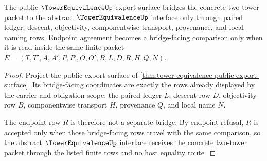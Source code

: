 \begin{theorem}
\label{thm:tower-equivalence-bridge-boundary}
The public $\TowerEquivalenceUp$ export surface bridges the concrete two-tower packet to the abstract $\TowerEquivalenceUp$ interface only through paired ledger, descent, objectivity, componentwise transport, provenance, and local naming rows. Endpoint agreement becomes a bridge-facing comparison only when it is read inside the same finite packet $E=(T,T',A,A',P,P',O,O',B,L,D,R,H,Q,N)$.
\end{theorem}
\begin{proof}
Project the public export surface of \autoref{thm:tower-equivalence-public-export-surface}. Its bridge-facing coordinates are exactly the rows already displayed by the carrier and obligation scope: the paired ledger $L$, descent row $D$, objectivity row $B$, componentwise transport $H$, provenance $Q$, and local name $N$.

The endpoint row $R$ is therefore not a separate bridge. By endpoint refusal, $R$ is accepted only when those bridge-facing rows travel with the same comparison, so the abstract $\TowerEquivalenceUp$ interface receives the concrete two-tower packet through the listed finite rows and no host equality route.
\end{proof}

